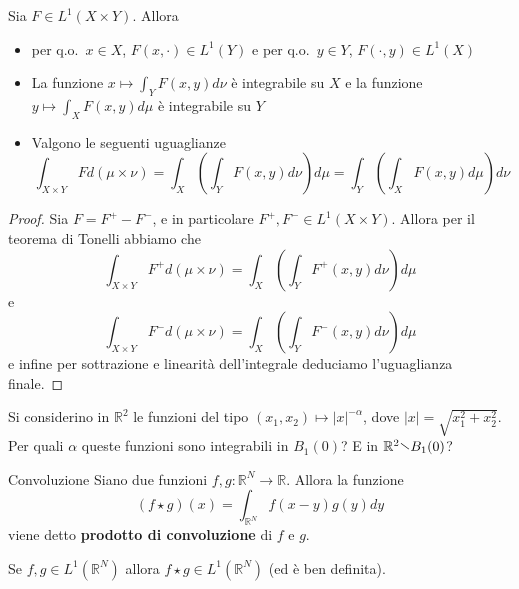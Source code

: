 \begin{theorem}[Fubini]
    Sia \(F \in L^{1}(X \times Y)\). Allora 
\begin{itemize}
    \item per q.o.~\(x \in X\), \(F(x, \cdot ) \in L^{1}(Y)\) e per q.o.~\(y \in
        Y\), \(F(\cdot, y) \in L^{1}(X)\)
    \item La funzione \(\displaystyle x \mapsto \int_Y F(x, y) d\nu\) è
        integrabile su \(X\) e la funzione \(\displaystyle y \mapsto \int_X F(x,
        y) d\mu\) è integrabile su \(Y\)
    \item Valgono le seguenti uguaglianze
        \[
            \int_{X \times Y} F d(\mu \times \nu) = \int_X \left( \int_Y F(x,y)
                d\nu \right) d\mu = \int_Y \left( \int_X F(x,y) d\mu \right) d\nu
        \]
\end{itemize}
\end{theorem}
\begin{proof}
    Sia \(F = F^{+} - F^{-}\), e in particolare \(F^{+}, F^{-} \in L^{1}(X
    \times Y)\). Allora per il teorema di Tonelli abbiamo che
    \[
        \int_{X \times Y} F^{+} d(\mu \times \nu) = \int_X \left( \int_Y F^{+}(x,y)
        d\nu \right) d\mu
    \]
    e
    \[
        \int_{X \times Y} F^{-} d(\mu \times \nu) = \int_X \left( \int_Y F^{-}(x,y)
        d\nu \right) d\mu
    \]
    e infine per sottrazione e linearità dell'integrale deduciamo l'uguaglianza
    finale.
\end{proof}
\begin{eser}
    Si considerino in \(\mathbb{R}^2\) le funzioni del tipo \((x_{1}, x_{2})
    \mapsto |x|^{-\alpha}\), dove \(|x| = \sqrt{x_{1}^2 + x_{2}^2}\). Per quali
    \(\alpha\) queste funzioni sono integrabili in \(B_{1}(0)\)? E in
    \(\mathbb{R}^2 \sminus B_{1}(0)\)?
\end{eser}
\begin{definition}{Convoluzione}
    Siano due funzioni \(f, g : \mathbb{R}^{N} \to \mathbb{R}\). Allora la
    funzione
    \[
        (f \star g)(x) = \int_{\mathbb{R}^{N}} f(x-y) g(y) dy
    \]
    viene detto \textbf{prodotto di convoluzione} di \(f\) e \(g\).
\end{definition}
\begin{proposition}\label{prp:convoluzione_l1}
    Se \(f, g \in L^{1}(\mathbb{R}^{N})\) allora \(f \star g \in
    L^{1}(\mathbb{R}^{N})\) (ed è ben definita).
\end{proposition}
